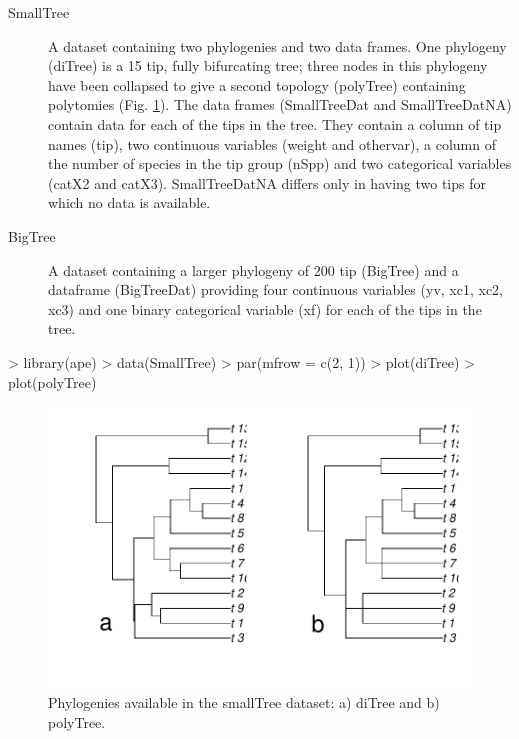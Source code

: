 \documentclass[a4paper]{article}
\begin{document}
\begin{description}
  \item[SmallTree] A dataset containing two phylogenies and two data frames. One phylogeny (diTree) is a 15 tip, fully bifurcating tree; three nodes in this phylogeny have been collapsed to give a second topology (polyTree) containing polytomies (Fig. \ref{smalltrees}). The data frames (SmallTreeDat and SmallTreeDatNA) contain data for each of the tips in the tree. They contain a column of tip names (tip), two continuous variables (weight and othervar), a column of the number of species in the tip group (nSpp) and two categorical variables (catX2 and catX3). SmallTreeDatNA differs only in having two tips for which no data is available.
  \item[BigTree] A dataset containing a larger phylogeny of 200 tip (BigTree) and a dataframe (BigTreeDat) providing four continuous variables (yv, xc1, xc2, xc3) and one binary categorical variable (xf) for each of the tips in the tree.
\end{description}


\begin{Schunk}
\begin{Sinput}
> library(ape)
> data(SmallTree)
> par(mfrow = c(2, 1))
> plot(diTree)
> plot(polyTree)
\end{Sinput}
\end{Schunk}
\begin{figure}[htbp]
  \begin{center}
\includegraphics{caic-003}
    \caption{Phylogenies available in the smallTree dataset: a) diTree and b) polyTree.}
    \label{smalltrees}
  \end{center}
\end{figure}
\end{document}

